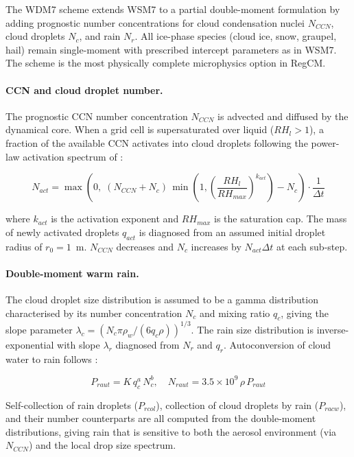 {The WDM7 scheme \citep{LimHong_10} extends WSM7 to a partial double-moment
formulation by adding prognostic number concentrations for cloud condensation
nuclei $N_{CCN}$, cloud droplets $N_c$, and rain $N_r$.  All ice-phase species
(cloud ice, snow, graupel, hail) remain single-moment with prescribed intercept
parameters as in WSM7.  The scheme is the most physically complete
microphysics option in RegCM.

\paragraph{CCN and cloud droplet number.}
The prognostic CCN number concentration $N_{CCN}$ is advected and diffused by
the dynamical core.  When a grid cell is supersaturated over liquid
($RH_l > 1$), a fraction of the available CCN activates into cloud droplets
following the power-law activation spectrum of \cite{KhairoutdinovKogan_00}:

\begin{equation}
  N_{act} = \max\!\left(0,\; (N_{CCN} + N_c)\,
            \min\!\left(1, \left(\frac{RH_l}{RH_{max}}\right)^{k_{act}}\right)
            - N_c\right) \cdot \frac{1}{\Delta t}
\end{equation}

where $k_{act}$ is the activation exponent and $RH_{max}$ is the saturation
cap.  The mass of newly activated droplets $q_{act}$ is diagnosed from an
assumed initial droplet radius of $r_0 = 1$~\textmu m.  $N_{CCN}$ decreases
and $N_c$ increases by $N_{act}\Delta t$ at each sub-step.

\paragraph{Double-moment warm rain.}
The cloud droplet size distribution is assumed to be a gamma distribution
characterised by its number concentration $N_c$ and mixing ratio $q_c$, giving
the slope parameter $\lambda_c = (N_c \pi \rho_w / (6 q_c \rho))^{1/3}$.  The
rain size distribution is inverse-exponential with slope $\lambda_r$ diagnosed
from $N_r$ and $q_r$.  Autoconversion of cloud water to rain follows
\cite{KhairoutdinovKogan_00}:

\begin{equation}
  P_{raut} = K\,q_c^{a}\,N_c^{b},
  \quad
  N_{raut} = 3.5\times10^9\,\rho\,P_{raut}
\end{equation}

Self-collection of rain droplets ($P_{rcol}$), collection of cloud droplets by
rain ($P_{racw}$), and their number counterparts are all computed from the
double-moment distributions, giving rain that is sensitive to both the
aerosol environment (via $N_{CCN}$) and the local drop size spectrum.

}
